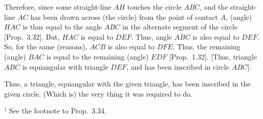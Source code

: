 \begin{Parallel}{}{}
{ Therefore, since some straight-line $AH$ touches the circle $ABC$, and the
 straight-line $AC$ has been drawn across (the circle) from the point of
 contact $A$, (angle) $HAC$ is thus equal to the angle $ABC$ in the alternate
 segment of the circle [Prop.~3.32]. But, $HAC$ is equal to $DEF$.
 Thus, angle $ABC$ is also equal to $DEF$. So, for the same (reasons),
 $ACB$ is also equal to $DFE$.  Thus, the remaining (angle) $BAC$ is equal
 to the remaining (angle) $EDF$ [Prop.~1.32]. [Thus, triangle
 $ABC$ is equiangular with triangle $DEF$, and has been inscribed in circle
 $ABC$].
 
 Thus, a triangle, equiangular with the given triangle, has been inscribed in
 the given circle. (Which is) the very thing it was required to do.}
\end{Parallel}
{\footnotesize \noindent$^\dag$ See the footnote
to Prop.~3.34.}

